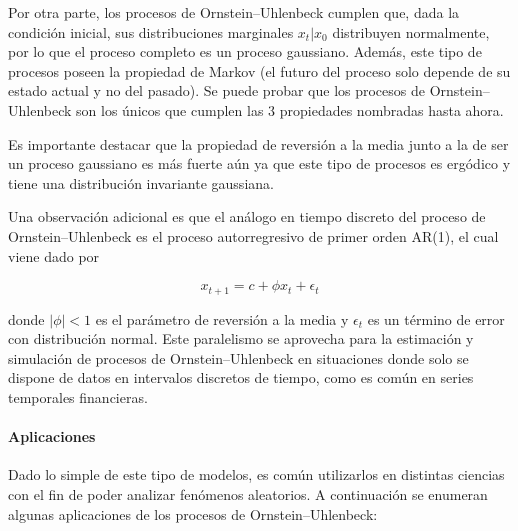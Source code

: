 
Por otra parte, los procesos de Ornstein–Uhlenbeck cumplen que, dada la condición inicial, sus distribuciones marginales $x_t|x_0$ distribuyen normalmente, por lo que el proceso completo es un proceso gaussiano. Además, este tipo de procesos poseen la propiedad de Markov (el futuro del proceso solo depende de su estado actual y no del pasado). Se puede probar que los procesos de Ornstein–Uhlenbeck son los únicos que cumplen las 3 propiedades nombradas hasta ahora.

Es importante destacar que la propiedad de reversión a la media junto a la de ser un proceso gaussiano es más fuerte aún ya que este tipo de procesos es ergódico y tiene una distribución invariante gaussiana.

Una observación adicional es que el análogo en tiempo discreto del proceso de Ornstein–Uhlenbeck es el proceso autorregresivo de primer orden AR(1), el cual viene dado por

\begin{equation*}
    x_{t+1} = c + \phi x_t + \epsilon_t
\end{equation*}

donde $|\phi|<1$ es el parámetro de reversión a la media y $\epsilon_t$ es un término de error con distribución normal. Este paralelismo se aprovecha para la estimación y simulación de procesos de Ornstein–Uhlenbeck en situaciones donde solo se dispone de datos en intervalos discretos de tiempo, como es común en series temporales financieras.

\paragraph{Aplicaciones}

Dado lo simple de este tipo de modelos, es común utilizarlos en distintas ciencias con el fin de poder analizar fenómenos aleatorios. A continuación se enumeran algunas aplicaciones de los procesos de Ornstein–Uhlenbeck:

